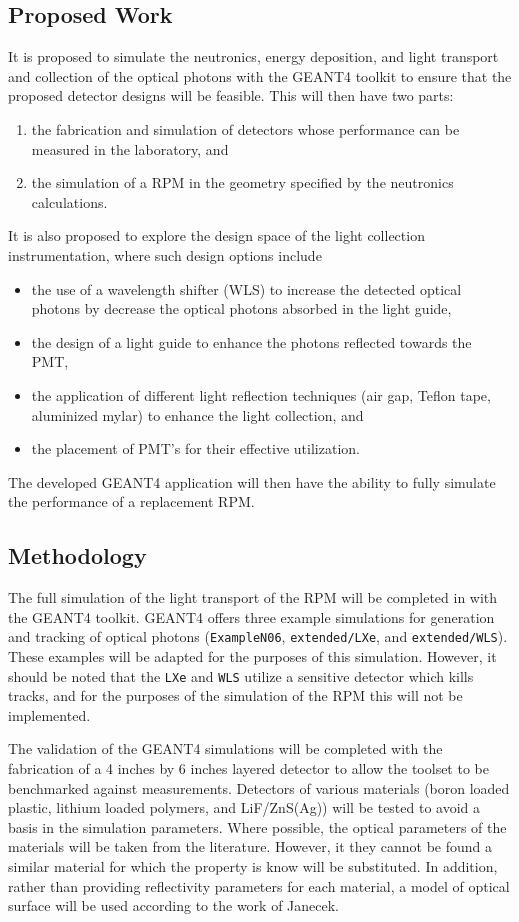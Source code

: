 \subsection{Proposed Work}
It is proposed to simulate the neutronics, energy deposition, and light transport and collection of the optical photons with the GEANT4 toolkit to ensure that the proposed detector designs will be feasible. 
This will then have two parts:
\begin{enumerate}
  \item the fabrication and simulation of detectors whose performance can be measured in the laboratory, and
  \item the simulation of a RPM in the geometry specified by the neutronics calculations.
\end{enumerate}
It is also proposed to explore the design space of the light collection instrumentation, where such design options include
\begin{itemize}
  \item the use of a wavelength shifter (WLS) to increase the detected optical photons by decrease the optical photons absorbed in the light guide,
  \item the design of a light guide to enhance the photons reflected towards the PMT,
  \item the application of different light reflection techniques (air gap, Teflon tape, aluminized mylar) to enhance the light collection, and
  \item the placement of PMT's for their effective utilization.
\end{itemize}
The developed GEANT4 application will then have the ability to fully simulate the performance of a replacement RPM.

\subsection{Methodology}
The full simulation of the light transport of the RPM will be completed in with the GEANT4 toolkit.
GEANT4 offers three example simulations for generation and tracking of optical photons (\verb+ExampleN06+, \verb+extended/LXe+, and \verb+extended/WLS+).
These examples will be adapted for the purposes of this simulation.
However, it should be noted that the \verb+LXe+ and \verb+WLS+ utilize a sensitive detector which kills tracks, and for the purposes of the simulation of the RPM this will not be implemented.

The validation of the GEANT4 simulations will be completed with the fabrication of a 4 inches by 6 inches layered detector to allow the toolset to be benchmarked against measurements.
Detectors of various materials (boron loaded plastic, lithium loaded polymers, and LiF/ZnS(Ag)) will be tested to avoid a basis in the simulation parameters.
Where possible, the optical parameters of the materials will be taken from the literature.
However, it they cannot be found a similar material for which the property is know will be substituted.
In addition, rather than providing reflectivity parameters for each material, a model of optical surface will be used according to the work of Janecek\cite{5485130}. 

